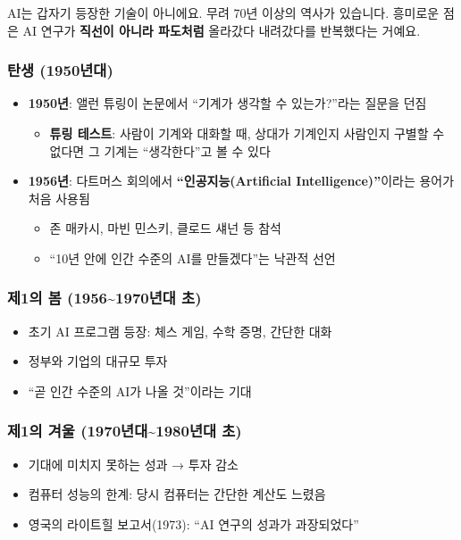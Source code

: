 \documentclass[11pt,a4paper]{article}
\begin{document}
AI는 갑자기 등장한 기술이 아니에요. 무려 70년 이상의 역사가 있습니다. 흥미로운 점은 AI 연구가 \textbf{직선이 아니라 파도처럼} 올라갔다 내려갔다를 반복했다는 거예요.

\subsubsection{ 탄생 (1950년대)}

\begin{itemize}[leftmargin=2em]
\item \textbf{1950년}: 앨런 튜링이 논문에서 ``기계가 생각할 수 있는가?''라는 질문을 던짐
  \begin{itemize}
  \item \textbf{튜링 테스트}: 사람이 기계와 대화할 때, 상대가 기계인지 사람인지 구별할 수 없다면 그 기계는 ``생각한다''고 볼 수 있다
  \end{itemize}
\item \textbf{1956년}: 다트머스 회의에서 \textbf{``인공지능(Artificial Intelligence)''}이라는 용어가 처음 사용됨
  \begin{itemize}
  \item 존 매카시, 마빈 민스키, 클로드 섀넌 등 참석
  \item ``10년 안에 인간 수준의 AI를 만들겠다''는 낙관적 선언
  \end{itemize}
\end{itemize}

\subsubsection{ 제1의 봄 (1956\textasciitilde 1970년대 초)}

\begin{itemize}[leftmargin=2em]
\item 초기 AI 프로그램 등장: 체스 게임, 수학 증명, 간단한 대화
\item 정부와 기업의 대규모 투자
\item ``곧 인간 수준의 AI가 나올 것''이라는 기대
\end{itemize}

\subsubsection{ 제1의 겨울 (1970년대\textasciitilde 1980년대 초)}

\begin{itemize}[leftmargin=2em]
\item 기대에 미치지 못하는 성과 → 투자 감소
\item 컴퓨터 성능의 한계: 당시 컴퓨터는 간단한 계산도 느렸음
\item 영국의 라이트힐 보고서(1973): ``AI 연구의 성과가 과장되었다''
\end{itemize}
\end{document}
